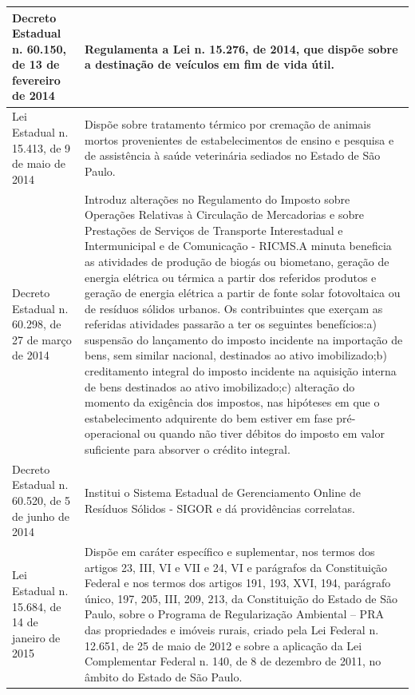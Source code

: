 \begin{center}
\begin{longtable}{|p{}|p{}|}
			\hline
			Decreto Estadual n. 60.150, de 13 de fevereiro de 2014 & Regulamenta  a  Lei  n.  15.276,  de  2014,  que  dispõe  sobre  a  destinação  de veículos em fim de vida útil. \\
			\hline
			Lei Estadual n. 15.413, de 9 de maio de 2014 & Dispõe sobre tratamento térmico por cremação de animais mortos provenientes de estabelecimentos de ensino e pesquisa e de assistência à saúde veterinária sediados no Estado de São Paulo. \\
			\hline
			Decreto Estadual n. 60.298, de 27 de março de 2014 & Introduz  alterações  no  Regulamento  do  Imposto  sobre  Operações  Relativas  à Circulação  de  Mercadorias  e  sobre  Prestações  de  Serviços  de  Transporte Interestadual e Intermunicipal e de Comunicação - RICMS.\newline{}A minuta beneficia as atividades de produção de biogás ou biometano, geração de  energia  elétrica  ou  térmica  a  partir  dos  referidos  produtos  e  geração  de energia  elétrica  a  partir  de  fonte  solar  fotovoltaica  ou  de  resíduos  sólidos urbanos. Os contribuintes que exerçam as referidas atividades passarão a ter os seguintes benefícios:\newline{}a) suspensão do lançamento do imposto incidente na importação de bens, sem similar nacional, destinados ao ativo imobilizado;\newline{}b)  creditamento  integral  do  imposto  incidente  na  aquisição  interna  de  bens destinados ao ativo imobilizado;\newline{}c) alteração do momento da exigência dos impostos, nas hipóteses  em  que o estabelecimento adquirente do bem estiver em fase pré-operacional ou quando não tiver débitos do imposto em valor suficiente para absorver o crédito integral. \\
			\hline
			Decreto Estadual n. 60.520, de 5 de junho de 2014 & Institui  o  Sistema  Estadual  de  Gerenciamento  Online  de  Resíduos  Sólidos  - SIGOR e dá providências correlatas. \\
			\hline
			Lei  Estadual  n.  15.684,  de  14 de janeiro de 2015 & Dispõe em caráter específico e suplementar, nos termos dos artigos 23, III, VI e VII e 24, VI e parágrafos da Constituição Federal e nos termos dos artigos 191, 193,  XVI,  194,  parágrafo  único,  197,  205,  III,  209,  213,  da  Constituição  do Estado de São Paulo, sobre o Programa de Regularização Ambiental – PRA das propriedades e imóveis rurais, criado pela Lei Federal n. 12.651, de 25 de maio de  2012  e  sobre  a  aplicação  da  Lei  Complementar  Federal  n.  140,  de  8  de dezembro de 2011, no âmbito do Estado de São Paulo. \\
			\hline
		\end{longtable}
	\end{center}
	\renewcommand\LTcaptype{table}
	 
